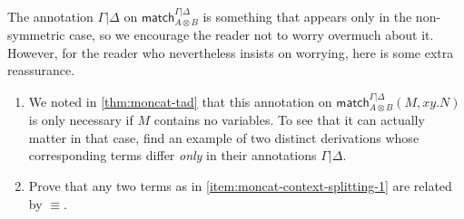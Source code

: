 \documentclass{book}
\let\types\vdash
\def\match{\mathsf{match}}
\def\one{\mathbf{1}}
\let\tensor\otimes
\def\tpair#1#2{\text{\textlquill} #1,#2 \text{\textrquill}}%
\begin{document}
\begin{ex}\label{ex:moncat-context-splitting}
  The annotation $\Gamma|\Delta$ on $\match_{A\tensor B}^{\Gamma|\Delta}$ is something that appears only in the non-symmetric case, so we encourage the reader not to worry overmuch about it.
  However, for the reader who nevertheless insists on worrying, here is some extra reassurance.
  \begin{enumerate}
  \item We noted in \cref{thm:moncat-tad} that this annotation on $\match_{A\tensor B}^{\Gamma|\Delta}(M,xy.N)$ is only necessary if $M$ contains no variables.
    To see that it can actually matter in that case, find an example of two distinct derivations whose corresponding terms differ \emph{only} in their annotations $\Gamma|\Delta$.\label{item:moncat-context-splitting-1}
  \item Prove that any two terms as in \ref{item:moncat-context-splitting-1} are related by $\equiv$.
  \end{enumerate}
\end{ex}
\end{document}
